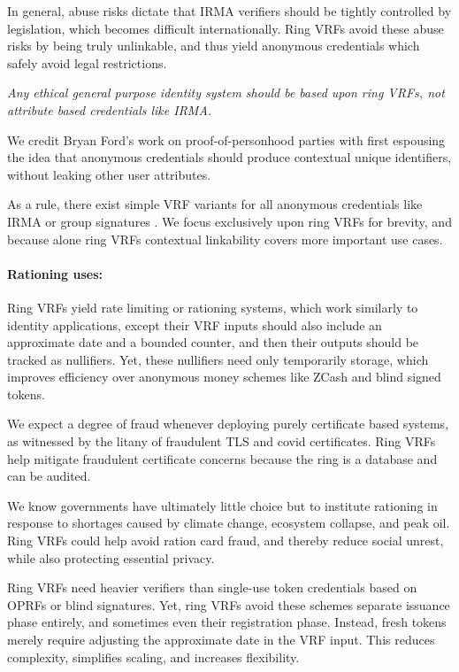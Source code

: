 In general, abuse risks dictate that IRMA verifiers should be tightly
controlled by legislation, which becomes difficult internationally. 
%
Ring VRFs avoid these abuse risks by being truly unlinkable, and thus
yield anonymous credentials which safely avoid legal restrictions.

{\it Any ethical general purpose identity system should be based
upon ring VRFs, not attribute based credentials like IRMA.}

We credit Bryan Ford's work on proof-of-personhood parties \cite{pop2008,pop2017}
with first espousing the idea that anonymous credentials should produce
contextual unique identifiers, without leaking other user attributes.

As a rule, there exist simple VRF variants for all anonymous credentials
like IRMA \cite{IRMAcredentials} or group signatures \cite{group_sig_survey}.
We focus exclusively upon ring VRFs for brevity, and because alone
ring VRFs contextual linkability covers more important use cases.

\paragraph{Rationing uses:}

Ring VRFs yield rate limiting or rationing systems, which work
similarly to identity applications, except their VRF inputs should also
include an approximate date and a bounded counter, and
 then their outputs should be tracked as nullifiers.
Yet, these nullifiers need only temporarily storage, which improves 
efficiency over anonymous money schemes like ZCash and blind signed tokens.

We expect a degree of fraud whenever deploying purely certificate
based systems, as witnessed by the litany of fraudulent TLS and covid
certificates.  Ring VRFs help mitigate fraudulent certificate concerns
because the ring is a database and can be audited.

We know governments have ultimately little choice but to institute
rationing in response to shortages caused by climate change, ecosystem
collapse, and peak oil.  Ring VRFs could help avoid ration card fraud,
and thereby reduce social unrest, while also protecting essential privacy.

Ring VRFs need heavier verifiers than single-use token credentials
based on OPRFs \cite{PrivacyPass} or blind signatures.
Yet, ring VRFs avoid these schemes separate issuance phase entirely,
and sometimes even their registration phase.  Instead, fresh tokens
merely require adjusting the approximate date in the VRF input.
This reduces complexity, simplifies scaling, and increases flexibility.

